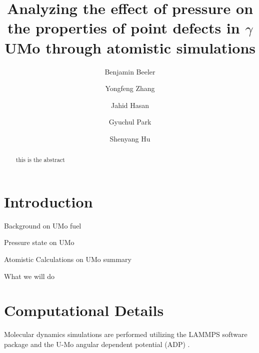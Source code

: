 \documentclass[11pt, oneside]{elsarticle}
\date{}							%
\begin{document}
\begin{frontmatter}

\title{Analyzing the effect of pressure on the properties of point defects in $\gamma$UMo through atomistic simulations}

\author[ncsu,inl]{Benjamin Beeler}
\author[wisc]{Yongfeng Zhang}
\author[ncsu]{Jahid Hasan}
\author[purdue]{Gyuchul Park}
\author[pnnl]{Shenyang Hu}
\address[ncsu]{North Carolina State University, Raleigh, NC 27695}
\address[inl]{Idaho National Laboratory, Idaho Falls, ID 83415}
\address[wisc]{University of Wisconsin-Madison, Madison, WI 53715}
\address[purdue]{Purdue University, XXXXX}
\address[pnnl]{Pacific Northwest National Laboratory, Idaho Falls, ID 83415}



\begin{abstract}
this is the abstract
\end{abstract}

\end{frontmatter}


\section{Introduction}

Background on UMo fuel

Pressure state on UMo

Atomistic Calculations on UMo summary

What we will do

\section{Computational Details}
Molecular dynamics simulations are performed utilizing the LAMMPS \cite{plimpton1995} software package and the U-Mo angular dependent potential (ADP) \cite{smirnovaADP}. 
\end{document}
